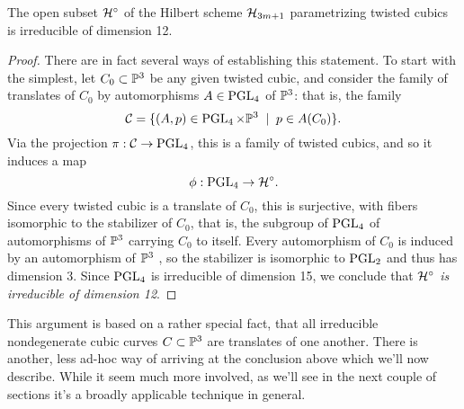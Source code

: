 \begin{proposition}\label{hilb of twisted cubics}
The open subset $\cH^\circ$ of the Hilbert scheme $\cH_{3m+1}$ parametrizing twisted cubics is irreducible of dimension 12.
\end{proposition}

\begin{proof}  There are in fact several ways of establishing this statement. To start with the simplest, let $C_0 \subset \PP^3$ be any given twisted cubic, and consider the family of translates of $C_0$ by automorphisms $A \in \PGL_4$ of $\PP^3$: that is, the family
$$
\cC = \{ (A, p) \in \PGL_4 \times \PP^3 \; \mid \; p \in A(C_0) \}.
$$
Via the projection $\pi : \cC \to \PGL_4$, this is a family of twisted cubics, and so it induces a map
$$
\phi : \PGL_4 \to \cH^\circ.
$$
Since every twisted cubic is a translate of $C_0$, this is surjective, with fibers isomorphic to the stabilizer of $C_0$, that is, the subgroup of $\PGL_4$ of automorphisms of $\PP^3$ carrying $C_0$ to itself. Every automorphism of $C_{0}$ is induced by an automorphism of $\PP^{3}$ , so the stabilizer is isomorphic to $\PGL_2$ and  thus has dimension 3. Since $\PGL_4$ is irreducible of dimension 15, we conclude that \emph{$\cH^\circ$ is irreducible of dimension 12}.
\end{proof}

This argument is based on a rather special fact, that all irreducible nondegenerate cubic curves $C \subset \PP^3$ are translates of one another. There is another, less ad-hoc way of arriving at the conclusion above which we'll now describe. While it seem much more involved, as we'll see in the next couple of sections it's a broadly applicable technique in general.

